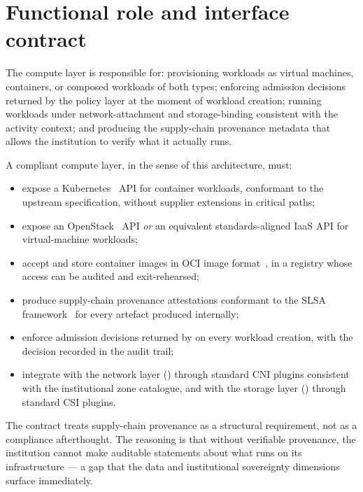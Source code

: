\section{Functional role and interface contract}
\label{sec:co-contract}

The compute layer is responsible for: provisioning workloads as
virtual machines, containers, or composed workloads of both types;
enforcing admission decisions returned by the policy layer at the
moment of workload creation; running workloads under
network-attachment and storage-binding consistent with the activity
context; and producing the supply-chain provenance metadata that
allows the institution to verify what it actually runs.

\begin{contractbox}
\noindent A compliant compute layer, in the sense of this
architecture, must:

\begin{itemize}[leftmargin=1.5em,nosep]
  \item expose a Kubernetes~\cite{kubernetes} API for container
    workloads, conformant to the upstream specification, without
    supplier extensions in critical paths;
  \item expose an OpenStack~\cite{openstack} API \emph{or} an
    equivalent standards-aligned IaaS API for virtual-machine
    workloads;
  \item accept and store container images in OCI image
    format~\cite{oci-image-spec}, in a registry whose access can be
    audited and exit-rehearsed;
  \item produce supply-chain provenance attestations conformant to
    the SLSA framework~\cite{slsa-spec} for every artefact produced
    internally;
  \item enforce admission decisions returned by 
    on every workload creation, with the decision recorded in the
    audit trail;
  \item integrate with the network layer
    () through standard CNI plugins consistent
    with the institutional zone catalogue, and with the storage
    layer () through standard CSI plugins.
\end{itemize}
\end{contractbox}

The contract treats supply-chain provenance as a structural
requirement, not as a compliance afterthought. The reasoning is that
without verifiable provenance, the institution cannot make
auditable statements about what runs on its infrastructure --- a
gap that the data and institutional sovereignty dimensions surface
immediately.

